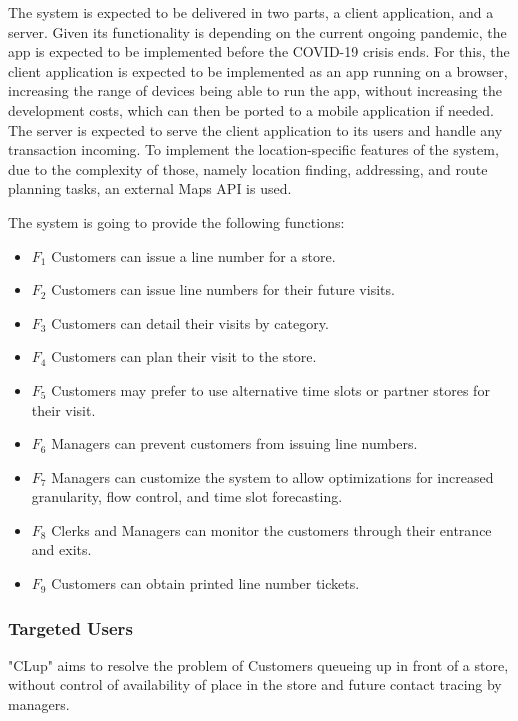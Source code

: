 The system is expected to be delivered in two parts, a client application, and a server.
Given its functionality is depending on the current ongoing pandemic, the app is expected to be implemented before the COVID-19 crisis ends.
For this, the client application is expected to be implemented as an app running on a browser, increasing the range of devices being able to run the app, without increasing the development costs, which can then be ported to a mobile application if needed.
The server is expected to serve the client application to its users and handle any transaction incoming.
To implement the location-specific features of the system, due to the complexity of those, namely location finding, addressing, and route planning tasks, an external Maps API is used.

The system is going to provide the following functions:
\begin{itemize}
    \item \textbf{$F_{1}$} Customers can issue a line number for a store.
    \item \textbf{$F_{2}$} Customers can issue line numbers for their future visits.
    \item \textbf{$F_{3}$} Customers can detail their visits by category.
    \item \textbf{$F_{4}$} Customers can plan their visit to the store.
    \item \textbf{$F_{5}$} Customers may prefer to use alternative time slots or partner stores for their visit.
    \item \textbf{$F_{6}$} Managers can prevent customers from issuing line numbers.
    \item \textbf{$F_{7}$} Managers can customize the system to allow optimizations for increased granularity, flow control, and time slot forecasting.
    \item \textbf{$F_{8}$} Clerks and Managers can monitor the customers through their entrance and exits.
    \item \textbf{$F_{9}$} Customers can obtain printed line number tickets.
\end{itemize}

\subsubsection{Targeted Users}
"CLup" aims to resolve the problem of Customers queueing up in front of a store, without control of availability of place in the store and future contact tracing by managers.
\\[0.5cm]

